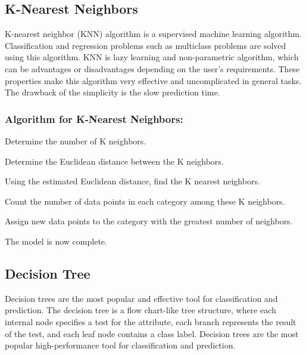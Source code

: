 \subsection{K-Nearest Neighbors} \label{subsec:K_nearest_neighbors}

K-nearest neighbor (KNN) algorithm is a supervised machine learning algorithm. Classification and regression problems such as multiclass problems are solved using this algorithm. KNN is lazy learning and non-parametric algorithm, which can be advantages or disadvantages depending on the user's requirements. These properties make this algorithm very effective and uncomplicated in general tasks. The drawback of the simplicity is the slow prediction time.

\subsubsection{Algorithm for K-Nearest Neighbors:}
\begin{steps}
  \vspace{-0.5em}
  \setlength{\itemsep}{-0.2em}
  \item Determine the number of K neighbors.
  \item Determine the Euclidean distance between the K neighbors.
  \item Using the estimated Euclidean distance, find the K nearest neighbors.
  \item Count the number of data points in each category among these K neighbors.
  \item Assign new data points to the category with the greatest number of neighbors.
  \item The model is now complete.
  \vspace{-1em}
\end{steps}

\subsection{Decision Tree} \label{subsec:decision_tree}
Decision trees are the most popular and effective tool for classification and prediction. The decision tree is a flow chart-like tree structure, where each internal node specifies a test for the attribute, each branch represents the result of the test, and each leaf node contains a class label. Decision trees are the most popular high-performance tool for classification and prediction.

